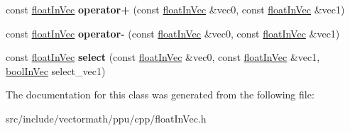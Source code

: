 \begin{DoxyCompactItemize}
\item 
\hypertarget{classVectormath_1_1floatInVec_a9e67ab843002e647fa7bb2caed760bdc}{const \hyperlink{classVectormath_1_1floatInVec}{float\-In\-Vec} {\bfseries operator+} (const \hyperlink{classVectormath_1_1floatInVec}{float\-In\-Vec} \&vec0, const \hyperlink{classVectormath_1_1floatInVec}{float\-In\-Vec} \&vec1)}\label{classVectormath_1_1floatInVec_a9e67ab843002e647fa7bb2caed760bdc}

\item 
\hypertarget{classVectormath_1_1floatInVec_ac6c858483e69952c29682d153854fbe2}{const \hyperlink{classVectormath_1_1floatInVec}{float\-In\-Vec} {\bfseries operator-\/} (const \hyperlink{classVectormath_1_1floatInVec}{float\-In\-Vec} \&vec0, const \hyperlink{classVectormath_1_1floatInVec}{float\-In\-Vec} \&vec1)}\label{classVectormath_1_1floatInVec_ac6c858483e69952c29682d153854fbe2}

\item 
\hypertarget{classVectormath_1_1floatInVec_a2970b847bee6dc51a58e7b308ab866c0}{const \hyperlink{classVectormath_1_1floatInVec}{float\-In\-Vec} {\bfseries select} (const \hyperlink{classVectormath_1_1floatInVec}{float\-In\-Vec} \&vec0, const \hyperlink{classVectormath_1_1floatInVec}{float\-In\-Vec} \&vec1, \hyperlink{classVectormath_1_1boolInVec}{bool\-In\-Vec} select\-\_\-vec1)}\label{classVectormath_1_1floatInVec_a2970b847bee6dc51a58e7b308ab866c0}

\end{DoxyCompactItemize}


The documentation for this class was generated from the following file\-:\begin{DoxyCompactItemize}
\item 
src/include/vectormath/ppu/cpp/float\-In\-Vec.\-h\end{DoxyCompactItemize}
